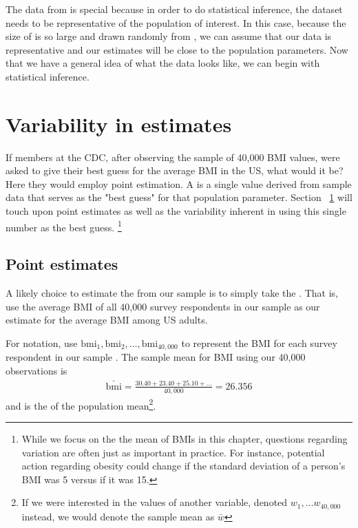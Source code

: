 The data from  is special because in order to do statistical inference, the dataset needs to be representative of the population of interest. In this case, because the size of  is so large and drawn randomly from , we can assume that our data is representative and our estimates will be close to the population parameters.  Now that we have a general idea of what the data looks like, we can begin with statistical inference.

\section{Variability in estimates}
\label{variabilityInEstimates}


If members at the CDC, after observing the sample of 40,000 BMI values, were asked to give their best guess for the average BMI in the US, what would it be? Here they would employ point estimation. A  is a single value derived from sample data that serves as the "best guess" for that population parameter. Section ~\ref{variabilityInEstimates} will touch upon point estimates as well as the variability inherent in using this single number as the best guess. \footnote{While we focus on the the mean of BMIs in this chapter, questions regarding variation are often just as important in practice. For instance, potential action regarding obesity could change if the standard deviation of a person's BMI was 5 versus if it was 15.} 

\subsection{Point estimates}
\label{pointEstimates}

A likely choice to estimate the  from our sample is to simply take the . That is, use the average BMI of all 40,000 survey respondents in our sample as our estimate for the average BMI among US adults. 

For notation, use $\mathrm{bmi}_1, \mathrm{bmi}_2, \ldots, \mathrm{bmi}_{40,000}$  to represent the BMI for each survey respondent in our sample . The sample mean for BMI using our 40,000 observations is 
\begin{eqnarray*}
\bar{\mathrm{bmi}} = \frac{30.40 + 23.40 + 25.10 + \dots}{40,000} = 26.356
\end{eqnarray*}
and is the  of the population mean\footnote{If we were interested in the values of another variable,  denoted $w_1,\ldots w_{40,000}$ instead, we would denote the sample mean as $\bar{w}$}. 

